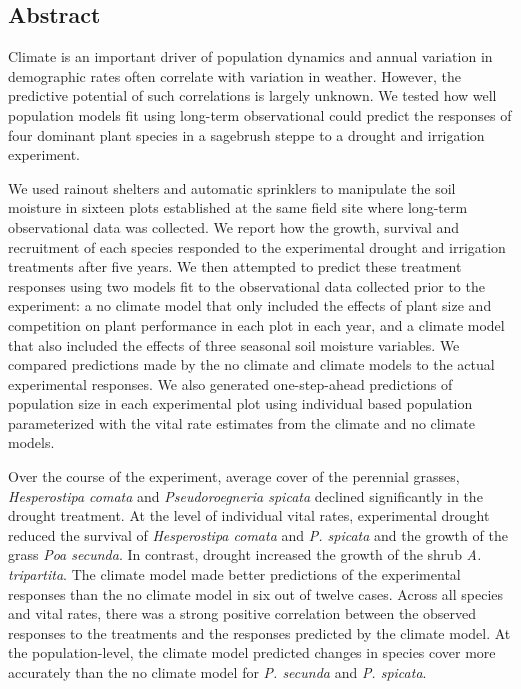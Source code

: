 \documentclass[11pt]{article}
\begin{document}
\begin{doublespacing} 

\linenumbers

\section*{Abstract}

Climate is an important driver of population dynamics and annual variation in demographic rates often correlate with variation in weather. However, the predictive potential of such correlations is largely unknown. We tested how well population models fit using long-term observational could predict the responses of four dominant plant species in a sagebrush steppe to a drought and irrigation experiment. 

We used rainout shelters and automatic sprinklers to manipulate the soil moisture in sixteen plots established at the same field site where long-term observational data was collected. We report how the growth, survival and recruitment of each species responded to the experimental drought and irrigation treatments after five years. We then attempted to predict these treatment responses using two models fit to the observational data collected prior to the experiment: a no climate model that only included the effects of plant size and competition on plant performance in each plot in each year, and a climate model that also included the effects of three seasonal soil moisture variables. We compared predictions made by the no climate and climate models to the actual experimental responses. We also generated one-step-ahead predictions of population size in each experimental plot using individual based population parameterized with the vital rate estimates from the climate and no climate models. 

Over the course of the experiment, average cover of the perennial grasses, \textit{Hesperostipa comata} and \textit{Pseudoroegneria spicata} declined significantly in the drought treatment. At the level of individual vital rates, experimental drought reduced the survival of \textit{Hesperostipa comata} and \textit{P. spicata} and the growth of the grass \textit{Poa secunda}. In contrast, drought increased the growth of the shrub \textit{A. tripartita}. The climate model made better predictions of the experimental responses than the no climate model in six out of twelve cases. Across all species and vital rates, there was a strong positive correlation between the observed responses to the treatments and the responses predicted by the climate model. At the population-level, the climate model predicted changes in species cover more accurately than the no climate model for \textit{P. secunda} and \textit{P. spicata}. 


\end{doublespacing}
\end{document}
